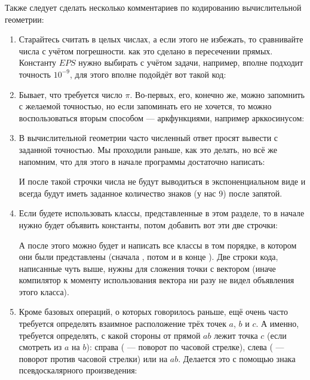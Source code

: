 Также следует сделать несколько комментариев по кодированию вычислительной геометрии:

\begin{enumerate}
    \item Старайтесь считать в целых числах, а если этого не избежать, то сравнивайте числа с учётом погрешности. как это сделано в пересечении прямых. Константу $EPS$ нужно выбирать с учётом задачи, например, вполне подходит точность $10^{-9}$, для этого вполне подойдёт вот такой код:
    
    
    \item Бывает, что требуется число $\pi$. Во-первых, его, конечно же, можно запомнить с желаемой точностью, но если запоминать его не хочется, то можно воспользоваться вторым способом — аркфункциями, например арккосинусом:
    
    
    \item В вычислительной геометрии часто численный ответ просят вывести с заданной точностью. Мы проходили раньше, как это делать, но всё же напомним, что для этого в начале программы достаточно написать:
    
    
    И после такой строчки числа не будут выводиться в экспоненциальном виде и всегда будут иметь заданное количество знаков (у нас 9) после запятой.
    
    \item Если будете использовать классы, представленные в этом разделе, то в начале нужно будет объявить константы, потом добавить вот эти две строчки:
    
    
    А после этого можно будет и написать все классы в том порядке, в котором они были представлены (сначала , потом  и в конце ). Две строки кода, написанные чуть выше, нужны для сложения точки с вектором (иначе компилятор к моменту использования вектора ни разу не видел объявления этого класса).
    
    \item Кроме базовых операций, о которых говорилось раньше, ещё очень часто требуется определять взаимное расположение трёх точек $a$, $b$ и $c$. А именно, требуется определять, с какой стороны от прямой $ab$ лежит точка $c$ (если смотреть из $a$ на $b$): справа ( — поворот по часовой стрелке), слева ( — поворот против часовой стрелки) или на $ab$. Делается это с помощью знака псевдоскалярного произведения:
    
\end{enumerate}
